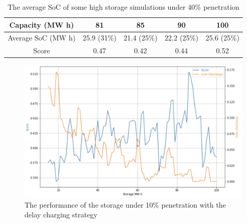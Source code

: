 \documentclass[12pt,a4paper]{report}
\begin{document}
            \begin{table}[ht]
                \centering
                \begin{tabulary}{\linewidth}{C C C C C}
                    \hline
                    Capacity (MW h) & 81 & 85 & 90 & 100 \\ \hline
                    Average SoC (MW h) & 25.9 (31\%) & 21.4 (25\%) & 22.2 (25\%) & 25.6 (25\%) \\ \hline
                    Score & 0.47 & 0.42 & 0.44 & 0.52 \\
                    \hline
                \end{tabulary}
                \caption{The average SoC of some high storage simulations under 40\% penetration}
                \label{table_high_storage_40}
            \end{table}


            \begin{figure}[ht]
                \centerline{\includegraphics[scale=0.9]{simu_score_delay_10}}
                \caption{The performance of the storage under 10\% penetration with the delay charging strategy}
                \label{fig_simu_score_delay_10}
            \end{figure}
\end{document}
